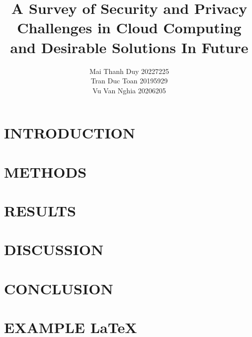 \documentclass[twocolumn]{article}
\let\oldmaketitle\maketitle
\renewcommand{\maketitle}{
\thispagestyle{empty}
\oldmaketitle
}
\begin{document}
\title{A Survey of Security and Privacy Challenges in Cloud Computing and Desirable Solutions In Future}
\author{
Mai Thanh Duy 20227225 \\
Tran Duc Toan 20195929 \\
Vu Van Nghia 20206205
}
\maketitle


\section{INTRODUCTION}


\section{METHODS}


\section{RESULTS}


\section{DISCUSSION}


\section{CONCLUSION}


\renewcommand{\refname}{REFERENCES}


\newpage
\section{EXAMPLE \LaTeX}

\end{document}
